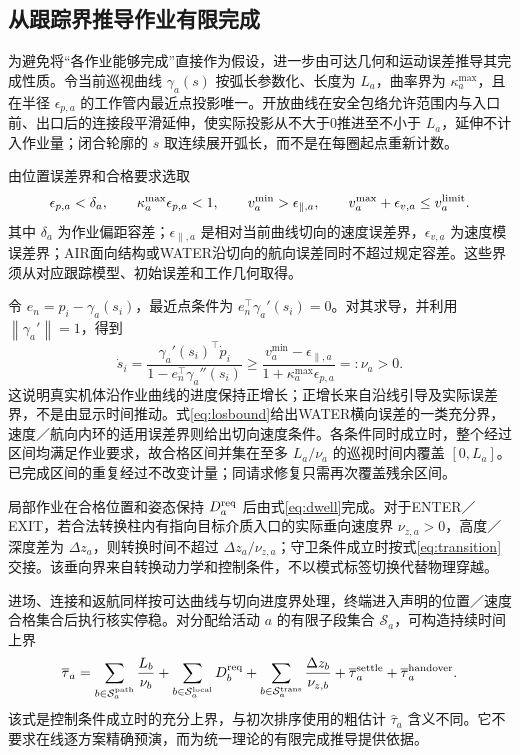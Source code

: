 \documentclass[UTF8,fontset=fandol,a4paper,11pt]{ctexart}
\newcommand{\norm}[1]{\left\lVert #1\right\rVert}
\begin{document}
\subsection{从跟踪界推导作业有限完成}

为避免将“各作业能够完成”直接作为假设，进一步由可达几何和运动误差推导其完成性质。令当前巡视曲线 $\gamma_a(s)$ 按弧长参数化、长度为 $L_a$，曲率界为 $\kappa_a^{\max}$，且在半径 $\epsilon_{p,a}$ 的工作管内最近点投影唯一。开放曲线在安全包络允许范围内与入口前、出口后的连接段平滑延伸，使实际投影从不大于0推进至不小于 $L_a$，延伸不计入作业量；闭合轮廓的 $s$ 取连续展开弧长，而不是在每圈起点重新计数。

由位置误差界和合格要求选取
\begin{equation}
 \epsilon_{p,a}<\delta_a,\qquad
 \kappa_a^{\max}\epsilon_{p,a}<1,\qquad
 v_a^{\min}>\epsilon_{\parallel,a},\qquad
 v_a^{\max}+\epsilon_{v,a}\leq v_a^{\rm limit}.
 \label{eq:progressconditions}
\end{equation}
其中 $\delta_a$ 为作业偏距容差；$\epsilon_{\parallel,a}$ 是相对当前曲线切向的速度误差界，$\epsilon_{v,a}$ 为速度模误差界；AIR面向结构或WATER沿切向的航向误差同时不超过规定容差。这些界须从对应跟踪模型、初始误差和工作几何取得。

令 $e_n=p_i-\gamma_a(s_i)$，最近点条件为 $e_n^\top\gamma_a'(s_i)=0$。对其求导，并利用 $\norm{\gamma_a'}=1$，得到
\begin{equation}
 \dot s_i=
 \frac{\gamma_a'(s_i)^\top\dot p_i}
      {1-e_n^\top\gamma_a''(s_i)}
 \geq
 \frac{v_a^{\min}-\epsilon_{\parallel,a}}
      {1+\kappa_a^{\max}\epsilon_{p,a}}
 =:\nu_a>0.
 \label{eq:positiveprogress}
\end{equation}
这说明真实机体沿作业曲线的进度保持正增长；正增长来自沿线引导及实际误差界，不是由显示时间推动。式\eqref{eq:losbound}给出WATER横向误差的一类充分界，速度／航向内环的适用误差界则给出切向速度条件。各条件同时成立时，整个经过区间均满足作业要求，故合格区间并集在至多 $L_a/\nu_a$ 的巡视时间内覆盖 $[0,L_a]$。已完成区间的重复经过不改变计量；同请求修复只需再次覆盖残余区间。

局部作业在合格位置和姿态保持 $D_a^{\rm req}$ 后由式\eqref{eq:dwell}完成。对于ENTER／EXIT，若合法转换柱内有指向目标介质入口的实际垂向速度界 $\nu_{z,a}>0$，高度／深度差为 $\Delta z_a$，则转换时间不超过 $\Delta z_a/\nu_{z,a}$；守卫条件成立时按式\eqref{eq:transition}交接。该垂向界来自转换动力学和控制条件，不以模式标签切换代替物理穿越。

进场、连接和返航同样按可达曲线与切向进度界处理，终端进入声明的位置／速度合格集合后执行核实停稳。对分配给活动 $a$ 的有限子段集合 $\mathcal S_a$，可构造持续时间上界
\begin{equation}
 \overline\tau_a=
 \sum_{b\in\mathcal S_a^{\rm path}}\frac{L_b}{\nu_b}
 +\sum_{b\in\mathcal S_a^{\rm local}}D_b^{\rm req}
 +\sum_{b\in\mathcal S_a^{\rm trans}}\frac{\Delta z_b}{\nu_{z,b}}
 +\overline\tau_a^{\rm settle}+\overline\tau_a^{\rm handover}.
 \label{eq:activitybound}
\end{equation}
该式是控制条件成立时的充分上界，与初次排序使用的粗估计 $\widehat\tau_a$ 含义不同。它不要求在线逐方案精确预演，而为统一理论的有限完成推导提供依据。
\end{document}
